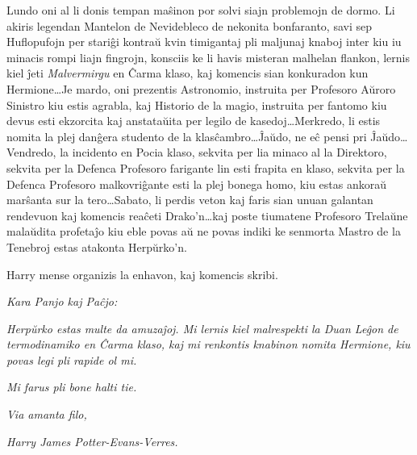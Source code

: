Lundo oni al li donis tempan maŝinon por solvi siajn problemojn de
dormo. Li akiris legendan Mantelon de Nevidebleco de nekonita
bonfaranto, savi sep Huflopufojn per stariĝi kontraŭ kvin timigantaj
pli maljunaj knaboj inter kiu iu minacis rompi liajn fingrojn,
konsciis ke li havis misteran malhelan flankon, lernis kiel ĵeti
\emph{Malvermirgu} en Ĉarma klaso, kaj komencis sian konkuradon kun
Hermione\ldots Je mardo, oni prezentis Astronomio, instruita per
Profesoro Aŭroro Sinistro kiu estis agrabla, kaj Historio de la magio,
instruita per fantomo kiu devus esti ekzorcita kaj anstataŭita per
legilo de kasedoj\ldots Merkredo, li estis nomita la plej danĝera
studento de la klasĉambro\ldots Ĵaŭdo, ne eĉ pensi pri Ĵaŭdo\ldots
Vendredo, la incidento en Pocia klaso, sekvita per lia minaco al la
Direktoro, sekvita per la Defenca Profesoro farigante lin esti frapita
en klaso, sekvita per la Defenca Profesoro malkovriĝante esti la plej
bonega homo, kiu estas ankoraŭ marŝanta sur la tero\ldots Sabato, li
perdis veton kaj faris sian unuan galantan rendevuon kaj komencis
reaĉeti Drako'n\ldots kaj poste tiumatene Profesoro Trelaŭne malaŭdita
profetaĵo kiu eble povas aŭ ne povas indiki ke senmorta Mastro de la
Tenebroj estas atakonta Herpŭrko'n.

Harry mense organizis la enhavon, kaj komencis skribi.

\emph{Kara Panjo kaj Paĉjo:}

\emph{Herpŭrko estas multe da amuzaĵoj. Mi lernis kiel malrespekti la
Duan Leĝon de termodinamiko en Ĉarma klaso, kaj mi renkontis knabinon
nomita Hermione, kiu povas legi pli rapide ol mi.}

\emph{Mi farus pli bone halti tie.}

\emph{Via amanta filo,}

\emph{Harry James Potter-Evans-Verres.}








